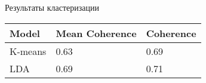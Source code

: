 \documentclass{beamer}
\begin{document}
\begin{frame}{Результаты кластеризации}
\begin{table}[h]
\centering
\begin{tabular}{|l|l|l|}
\hline
\textbf{Model} & \textbf{Mean Coherence} & \multicolumn{1}{c|}{\textbf{Coherence}} \\ \hline
K-means        & 0.63              & 0.69                                    \\ \hline
LDA            & 0.69         & 0.71                                    \\ \hline
\end{tabular}
\label{tab:ClusteringPivotTable}
\end{table}

\end{frame}
\end{document}
